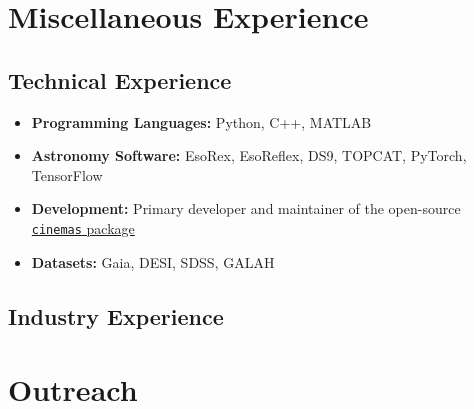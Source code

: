 \documentclass[a4paper,10pt]{article}
\begin{document}
\section*{Miscellaneous Experience}

\subsection{Technical Experience}

\begin{itemize}
  \item \textbf{Programming Languages:} Python, C++, MATLAB

  \item \textbf{Astronomy Software:} EsoRex, EsoReflex, DS9, TOPCAT, PyTorch, TensorFlow

  \item \textbf{Development:} Primary developer and maintainer of the open-source \href{https://github.com/xbyrne/cinemas}{\texttt{cinemas} package}

  \item \textbf{Datasets:} Gaia, DESI, SDSS, GALAH
\end{itemize}

\subsection{Industry Experience}

\begin{itemize}
\end{itemize}

\section*{Outreach}
\end{document}
